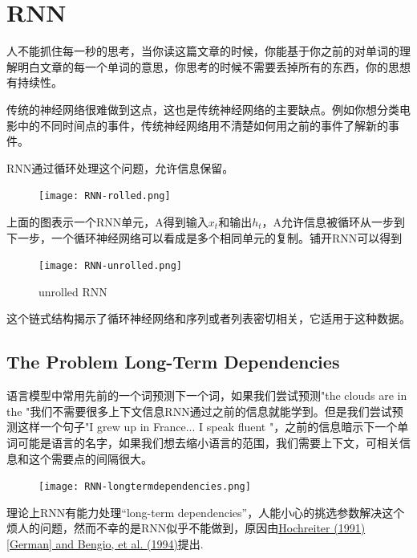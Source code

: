 \section{RNN}
人不能抓住每一秒的思考，当你读这篇文章的时候，你能基于你之前的对单词的理解明白文章的每一个单词的意思，你思考的时候不需要丢掉所有的东西，你的思想有持续性。\par
传统的神经网络很难做到这点，这也是传统神经网络的主要缺点。例如你想分类电影中的不同时间点的事件，传统神经网络用不清楚如何用之前的事件了解新的事件。\par
RNN通过循环处理这个问题，允许信息保留。\par
\begin{figure}[!ht]
\centering
\texttt{[image: RNN-rolled.png]}
\end{figure}
上面的图表示一个RNN单元，A得到输入$x_t$和输出$h_t$，A允许信息被循环从一步到下一步，一个循环神经网络可以看成是多个相同单元的复制。铺开RNN可以得到
\begin{figure}[!ht]
\centering
\texttt{[image: RNN-unrolled.png]}
\caption{unrolled RNN}
\end{figure}
这个链式结构揭示了循环神经网络和序列或者列表密切相关，它适用于这种数据。
\subsection{The Problem Long-Term Dependencies}
语言模型中常用先前的一个词预测下一个词，如果我们尝试预测"the clouds are in the {\color{red}{sky}}"我们不需要很多上下文信息RNN通过之前的信息就能学到。但是我们尝试预测这样一个句子"I grew up in France... I speak fluent {\color{red}{France}}"，之前的信息暗示下一个单词可能是语言的名字，如果我们想去缩小语言的范围，我们需要上下文{\color{red}{France}}，可相关信息和这个需要点的间隔很大。
\begin{figure}[!ht]
\centering
\texttt{[image: RNN-longtermdependencies.png]}
\end{figure}
理论上RNN有能力处理“long-term dependencies”，人能小心的挑选参数解决这个烦人的问题，然而不幸的是RNN似乎不能做到，原因由\href{http://www-dsi.ing.unifi.it/~paolo/ps/tnn-94-gradient.pdf}{Hochreiter (1991) [German] and Bengio, et al. (1994)}提出.
